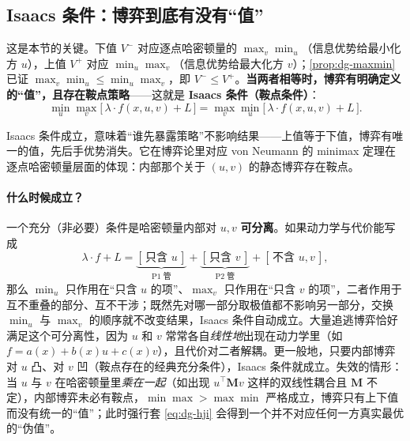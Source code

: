 \subsection{Isaacs 条件：博弈到底有没有“值”}
\label{sec:dg-isaacs-cond}
这是本节的关键。下值 $V^-$ 对应逐点哈密顿量的 $\max_v\min_u$（信息优势给最小化方 $u$），上值 $V^+$ 对应 $\min_u\max_v$（信息优势给最大化方 $v$）；\cref{prop:dg-maxmin} 已证 $\max_v\min_u\le\min_u\max_v$，即 $V^-\le V^+$。\textbf{当两者相等时，博弈有明确定义的“值”，且存在鞍点策略}——这就是 \textbf{Isaacs 条件（鞍点条件）}：
\begin{equation}
  \min_u\max_v\big[\,\lambda\cdot f(x,u,v)+L\,\big]=\max_v\min_u\big[\,\lambda\cdot f(x,u,v)+L\,\big].
  \label{eq:dg-isaacs-cond}
\end{equation}

\begin{insight}
Isaacs 条件成立，意味着“谁先暴露策略”不影响结果——上值等于下值，博弈有唯一的值，先后手优势消失。它在博弈论里对应 von Neumann 的 minimax 定理在逐点哈密顿量层面的体现：内部那个关于 $(u,v)$ 的静态博弈存在鞍点。
\end{insight}

\paragraph{什么时候成立？}
一个充分（非必要）条件是哈密顿量内部对 $u,v$ \textbf{可分离}。如果动力学与代价能写成
\begin{equation}
  \lambda\cdot f+L=\underbrace{[\,\text{只含 }u\,]}_{\text{P1 管}}+\underbrace{[\,\text{只含 }v\,]}_{\text{P2 管}}+[\,\text{不含 }u,v\,],
  \label{eq:dg-separable}
\end{equation}
那么 $\min_u$ 只作用在“只含 $u$ 的项”、$\max_v$ 只作用在“只含 $v$ 的项”，二者作用于互不重叠的部分、互不干涉；既然先对哪一部分取极值都不影响另一部分，交换 $\min_u$ 与 $\max_v$ 的顺序就不改变结果，Isaacs 条件自动成立。大量追逃博弈恰好满足这个可分离性，因为 $u$ 和 $v$ 常常各自\emph{线性地}出现在动力学里（如 $f=a(x)+b(x)u+c(x)v$），且代价对二者解耦。更一般地，只要内部博弈对 $u$ 凸、对 $v$ 凹（鞍点存在的经典充分条件），Isaacs 条件就成立。失效的情形：当 $u$ 与 $v$ 在哈密顿量里\emph{乘在一起}（如出现 $u^\top \mathbf M v$ 这样的双线性耦合且 $\mathbf M$ 不定），内部博弈未必有鞍点，$\min\max>\max\min$ 严格成立，博弈只有上下值而没有统一的“值”；此时强行套 \cref{eq:dg-hji} 会得到一个并不对应任何一方真实最优的“伪值”。

